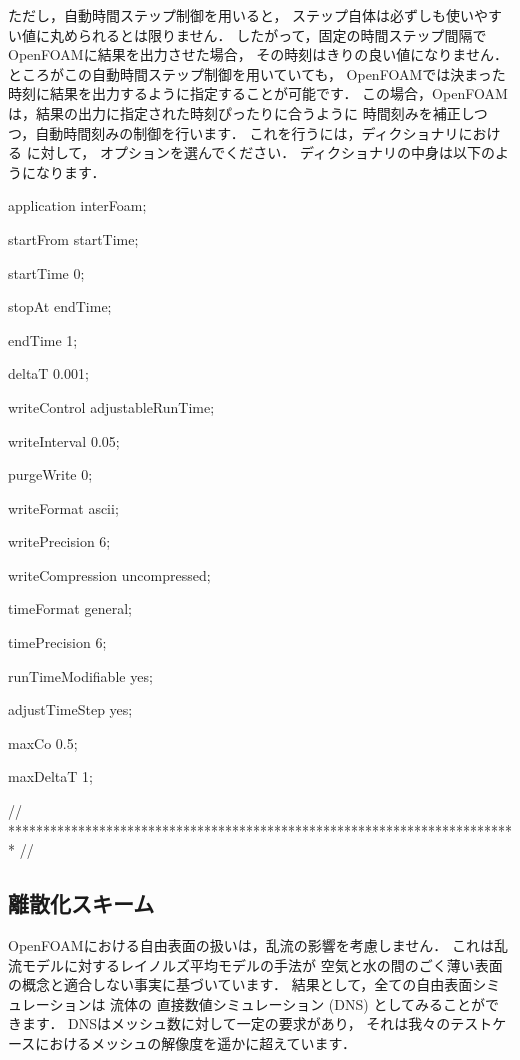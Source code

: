 ただし，自動時間ステップ制御を用いると，
ステップ自体は必ずしも使いやすい値に丸められるとは限りません．
したがって，固定の時間ステップ間隔でOpenFOAMに結果を出力させた場合，
その時刻はきりの良い値になりません．
ところがこの自動時間ステップ制御を用いていても，
OpenFOAMでは決まった時刻に結果を出力するように指定することが可能です．
この場合，OpenFOAMは，結果の出力に指定された時刻ぴったりに合うように
時間刻みを補正しつつ，自動時間刻みの制御を行います．
これを行うには，ディクショナリにおける
%
%
に対して，
%
%
オプションを選んでください．
%
%
ディクショナリの中身は以下のようになります．
\begin{OFverbatim}[file, linenum=17]

application     interFoam;

startFrom       startTime;

startTime       0;

stopAt          endTime;

endTime         1;

deltaT          0.001;

writeControl    adjustableRunTime;

writeInterval   0.05;

purgeWrite      0;

writeFormat     ascii;

writePrecision  6;

writeCompression uncompressed;

timeFormat      general;

timePrecision   6;

runTimeModifiable yes;

adjustTimeStep  yes;

maxCo           0.5;

maxDeltaT       1;


// ************************************************************************* //
\end{OFverbatim}


\subsection{離散化スキーム}
\label{ssec:2.3.6}
OpenFOAMにおける自由表面の扱いは，乱流の影響を考慮しません．
これは乱流モデルに対するレイノルズ平均モデルの手法が
空気と水の間のごく薄い表面の概念と適合しない事実に基づいています．
結果として，全ての自由表面シミュレーションは
流体の
%
直接数値シミュレーション (DNS) としてみることができます．
DNSはメッシュ数に対して一定の要求があり，
それは我々のテストケースにおけるメッシュの解像度を遥かに超えています．

